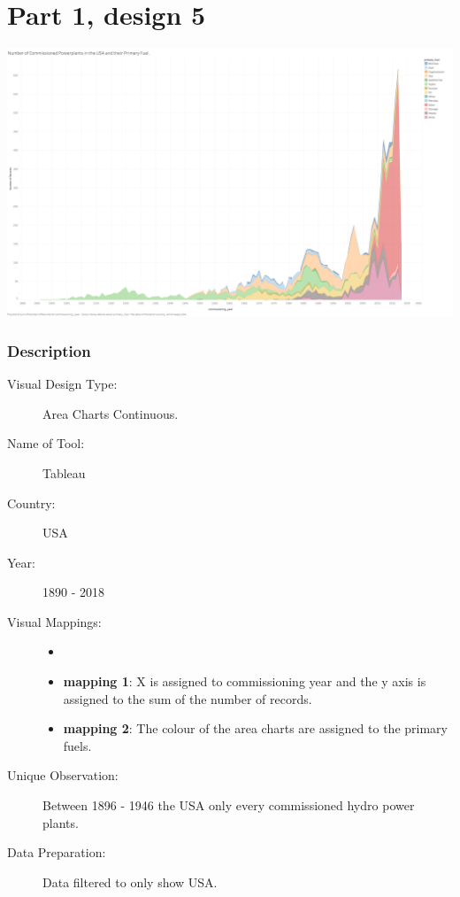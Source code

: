 \hypertarget{part-1-design-5}{%
\section{Part 1, design 5}\label{part-1-design-5}}

\centering
\includegraphics[width=15cm]{Viz5.png}

\hypertarget{description}{%
\subsubsection{Description}\label{description}}

\begin{description}
\item[Visual Design Type:]
Area Charts Continuous.
\item[Name of Tool:]
Tableau
\item[Country:]
USA
\item[Year:]
1890 - 2018
\item[Visual Mappings:]
\begin{itemize}
	\tightlist
	\item[  ]
\end{itemize}
\begin{itemize}
\tightlist
\item
  \textbf{mapping 1}: X is assigned to commissioning year and the y axis is assigned to the sum of the number of records.
\end{itemize}

\begin{itemize}
\tightlist
\item
  \textbf{mapping 2}: The colour of the area charts are assigned to the primary fuels.
\end{itemize}
\item[Unique Observation:]
Between 1896 - 1946 the USA only every commissioned hydro power plants.
\item[Data Preparation:]
Data filtered to only show USA.
\end{description} 
